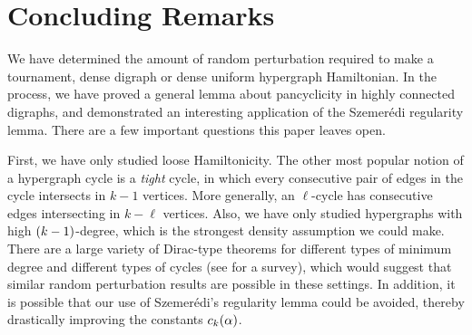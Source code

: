 \documentclass[11pt,english]{article}
\theoremstyle{plain}
\theoremstyle{definition}
\theoremstyle{definition}
\theoremstyle{plain}
\theoremstyle{plain}
\theoremstyle{plain}
\theoremstyle{plain}
\theoremstyle{remark}
\theoremstyle{remark}
\let\originalleft\left
\let\originalright\right
\renewcommand{\left}{\mathopen{}\mathclose\bgroup\originalleft}
\renewcommand{\right}{\aftergroup\egroup\originalright}
\begin{document}
\section{Concluding Remarks}

We have determined the amount of random perturbation required to make
a tournament, dense digraph or dense uniform hypergraph Hamiltonian. In
the process, we have proved a general lemma about pancyclicity in
highly connected digraphs, and demonstrated an interesting application
of the Szemer\'edi regularity lemma. There are a few important questions
this paper leaves open.

First, we have only studied loose Hamiltonicity. The other most popular
notion of a hypergraph cycle is a \emph{tight} cycle, in which every
consecutive pair of edges in the cycle intersects in $k-1$ vertices.
More generally, an $\ell$-cycle has consecutive edges intersecting
in $k-\ell$ vertices. Also, we have only studied hypergraphs with
high $\left(k-1\right)$-degree, which is the strongest density assumption
we could make. There are a large variety of Dirac-type theorems for
different types of minimum degree and different types of cycles (see
\cite{RR10} for a survey), which would suggest that similar random
perturbation results are possible in these settings. In addition,
it is possible that our use of Szemer\'edi's regularity lemma could
be avoided, thereby drastically improving the constants $\chyp\left(\alpha\right)$.
\end{document}
